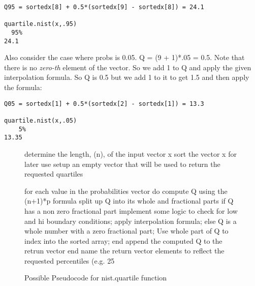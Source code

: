 \documentclass{article}
\begin{document}
\begin{verbatim}
Q95 = sortedx[8] + 0.5*(sortedx[9] - sortedx[8]) = 24.1 

quartile.nist(x,.95)
  95% 
24.1 

\end{verbatim}
\noindent
Also consider the case where probs is 0.05. Q = (9 + 1)*.05 = 0.5. Note that there is no \emph{zero-th} element of the vector. So we add 1 to Q and apply the given interpolation formula. So Q is 0.5 but we add 1 to it to get 1.5 and then apply the formula:
\begin{verbatim}
Q05 = sortedx[1] + 0.5*(sortedx[2] - sortedx[1]) = 13.3

quartile.nist(x,.05)
    5% 
13.35 
\end{verbatim}


\begin{figure}[h]
\caption{Possible Pseudocode for nist.quartile function}

\begin{PseudoCode}
determine the length, (n), of the input vector x 
sort the vector x for later use
setup an empty vector that will be used to return the requested quartiles

for each value in the probabilities vector do
    compute Q using the (n+1)*p formula
    split up Q into its whole and fractional parts
    if Q has a non zero fractional part
        implement some logic to check for low and hi boundary conditions;
        apply interpolation formula;
    else
        Q is a whole number with a zero fractional part;
        Use whole part of Q to index into the sorted array;
    end
    append the computed Q to the retrun vector
end
name the return vector elements to reflect the requested percentiles (e.g. 25%
\end{PseudoCode}
\end{figure}
\end{document}
